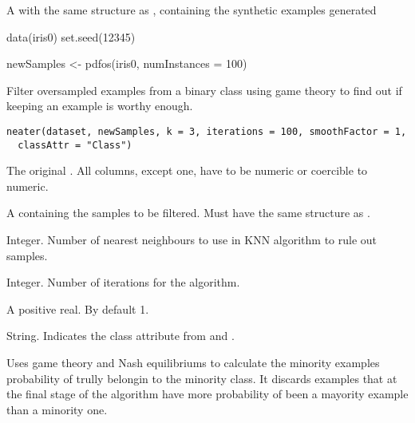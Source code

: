 %
\begin{Value}
A  with the same structure as ,
containing the synthetic examples generated
\end{Value}
%
\begin{Examples}
\begin{ExampleCode}
data(iris0)
set.seed(12345)

newSamples <- pdfos(iris0, numInstances = 100)

\end{ExampleCode}
\end{Examples}
%
\begin{Description}\relax
Filter oversampled examples from a binary class  using game
theory to find out if keeping an example is worthy enough.
\end{Description}
%
\begin{Usage}
\begin{verbatim}
neater(dataset, newSamples, k = 3, iterations = 100, smoothFactor = 1,
  classAttr = "Class")
\end{verbatim}
\end{Usage}
%
\begin{Arguments}
\begin{ldescription}
\item[\code{dataset}] The original . All columns, except
 one, have to be numeric or coercible to numeric.

\item[\code{newSamples}] A  containing the samples to be filtered.
Must have the same structure as .

\item[\code{k}] Integer. Number of nearest neighbours to use in KNN algorithm to
rule out samples.

\item[\code{iterations}] Integer. Number of iterations for the algorithm.

\item[\code{smoothFactor}] A positive real. By default 1.

\item[\code{classAttr}] String. Indicates the class attribute from 
and .
\end{ldescription}
\end{Arguments}
%
\begin{Details}\relax
Uses game theory and Nash equilibriums to calculate the minority examples
probability of trully belongin to the minority class. It discards examples
that at the final stage of the algorithm have more probability of been a
mayority example than a minority one.
\end{Details}
